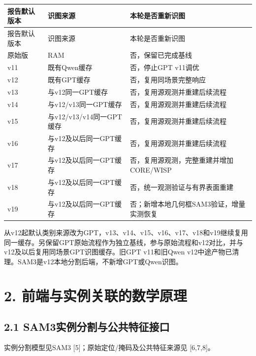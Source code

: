 \documentclass[UTF8,fontset=fandol]{ctexart}
\begin{document}
{\small
\begin{longtable}{|p{}|p{}|p{}|}
\hline
报告默认版本 & 识图来源 & 本轮是否重新识图 \\ \hline
\endfirsthead
\hline
报告默认版本 & 识图来源 & 本轮是否重新识图 \\ \hline
\endhead
原始版 & RAM & 否，保留已完成基线 \\ \hline
v11 & 既有Qwen缓存 & 否，停止GPT v11调优 \\ \hline
v12 & 既有GPT缓存 & 否，复用同场景完整响应 \\ \hline
v13 & 与v12同一GPT缓存 & 否，复用源观测并重建后续流程 \\ \hline
v14 & 与v12/v13同一GPT缓存 & 否，复用源观测并重建后续流程 \\ \hline
v15 & 与v12/v13/v14同一GPT缓存 & 否，复用源观测并重建后续流程 \\ \hline
v16 & 与v12及以后同一GPT缓存 & 否，复用源观测并重建后续流程 \\ \hline
v17 & 与v12及以后同一GPT缓存 & 否，复用源观测，完整重建并增加CORE/WISP \\ \hline
v18 & 与v12及以后同一GPT缓存 & 否，统一观测验证与有界表面重建 \\ \hline
v19 & 与v12及以后同一GPT缓存 & 否；新增本地几何框SAM3验证，增量实测恢复 \\ \hline
\end{longtable}
}

从v12起默认类别来源改为GPT，v13、v14、v15、v16、v17、v18和v19继续复用同一缓存。另保留GPT原始流程作为独立基线，参与原始流程和v12对比，并与v12及以后复用同场景GPT识图缓存。旧GPT v11和旧Qwen v12中途产物已清理。SAM3是v12本地分割后端，不新增GPT或Qwen识图。



\section*{2. 前端与实例关联的数学原理}

\subsection*{2.1 SAM3实例分割与公共特征接口}

实例分割模型见SAM3 [5]；原始定位/掩码及公共特征来源见 [6,7,8]。
\end{document}
